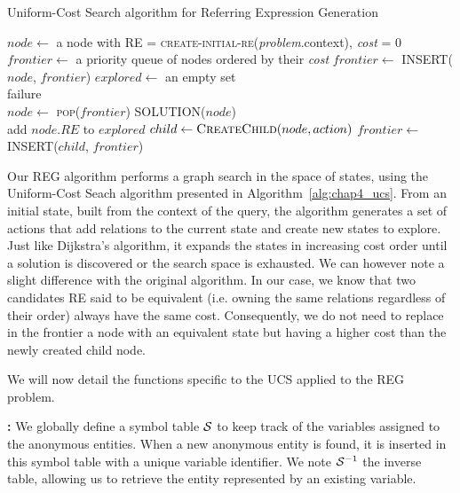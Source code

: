 \begin{algorithm}[!htbp]
\caption{Uniform-Cost Search algorithm for Referring Expression Generation}
\label{alg:chap4_ucs}
\begin{algorithmic}
    \State $node\leftarrow$ a node with RE = \textsc{create-initial-re}(\textit{problem}.context), \textit{cost} = 0
    \State $frontier\leftarrow$ a priority queue of nodes ordered by their \textit{cost}
    \State $frontier\leftarrow$ \textsc{INSERT}($node$, $frontier$)
    \State $explored\leftarrow$ an empty set
    \\
    \Loop
        	\State \Return failure
        \EndIf
        \\
        \State $node\leftarrow$ \textsc{pop}($frontier$)
        	\State \Return \textsc{SOLUTION}($node$)
        \EndIf
        \\
        \State add $node.RE$ to $explored$
            \State $child \leftarrow \textsc{CreateChild}(node, action)$
            	\State $frontier\leftarrow$ \textsc{INSERT}($child$, $frontier$)
            \EndIf
        \EndFor
    \EndLoop
\EndFunction
\end{algorithmic}
\end{algorithm}

Our REG algorithm performs a graph search in the space of states, using the Uniform-Cost Seach algorithm presented in Algorithm~\ref{alg:chap4_ucs}.
From an initial state, built from the context of the query, the algorithm generates a set of actions that add relations to the current state and create new states to explore. Just like Dijkstra's algorithm, it expands the states in increasing cost order until a solution is discovered or the search space is exhausted. We can however note a slight difference with the original algorithm. In our case, we know that two candidates RE said to be equivalent (i.e. owning the same relations regardless of their order) always have the same cost. Consequently, we do not need to replace in the frontier a node with an equivalent state but having a higher cost than the newly created child node.

We will now detail the functions specific to the UCS applied to the REG problem.

\textbf{\tovariable: }
We globally define a symbol table $\mathcal{S}$ to keep track of the variables assigned to the anonymous entities. When a new anonymous entity is found, it is inserted in this symbol table with a unique variable identifier. We note $\mathcal{S}^{-1}$ the inverse table, allowing us to retrieve the entity represented by an existing variable.

